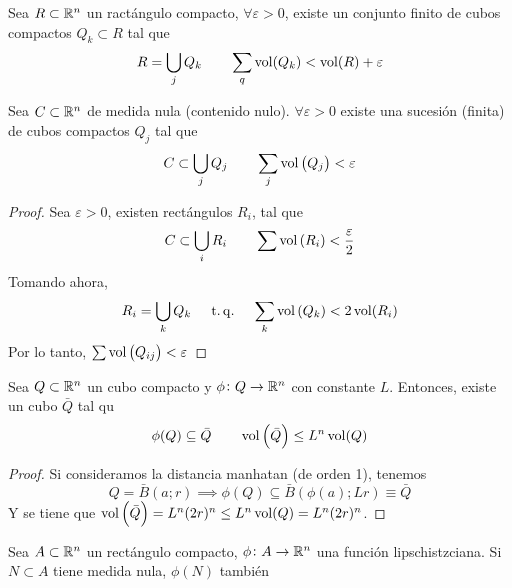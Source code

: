 \begin{lema*}
    Sea $R \subset \mathbb{R}^n$ un ractángulo compacto, $\forall \varepsilon > 0$, existe un conjunto finito de cubos compactos $Q_k \subset R$ tal que
    \[
        R = \bigcup_{j} Q_k \qquad
        \sum_{q} \operatorname{vol}(Q_k) < \operatorname{vol}(R) + \varepsilon
    \]
\end{lema*}

\begin{lema*}
    Sea $C \subset \mathbb{R}^n$ de medida nula (contenido nulo). $\forall \varepsilon > 0$ existe una sucesión (finita) de cubos compactos $Q_j$ tal que
    \[
        C \subset \bigcup_{j} Q_j \qquad
        \sum_j \operatorname{vol}\left( Q_j \right) < \varepsilon
    \]
\end{lema*}

\begin{proof}
    Sea $\varepsilon > 0$, existen rectángulos $R_i$, tal que
    \[
        C \subset \bigcup_i R_i \qquad
        \sum \operatorname{vol}\left( R_i \right) < \frac{\varepsilon}{2}
    \]
    Tomando ahora,
    \[
        R_i = \bigcup_k Q_k \quad \operatorname{\;t.q.\;} \quad
        \sum_k \operatorname{vol}\left( Q_k \right) < 2 \operatorname{vol}(R_i)
    \]
    Por lo tanto, $\sum \operatorname{vol}\left(Q_{ij}\right) < \varepsilon$
\end{proof}

\begin{lema*}
    Sea $Q \subset \mathbb{R}^n$ un cubo compacto y $\phi \colon Q \to \mathbb{R}^n$ con constante $L$. Entonces, existe un cubo
    $\bar{Q}$ tal qu
    \[
        \phi(Q) \subseteq \bar{Q} \qquad
        \operatorname{vol}\left( \bar{Q} \right) \leq L^n \operatorname{vol}(Q)
    \]
\end{lema*}

\begin{proof}
    Si consideramos la distancia manhatan (de orden 1), tenemos
    \[
        Q = \bar{B}(a;r) \implies \phi(Q) \subseteq \bar{B} \left( \phi(a); Lr \right) \equiv \bar{Q}
    \]
    Y se tiene que $\operatorname{vol}\left( \bar{Q} \right) = L^n (2r)^n \leq L^n \operatorname{vol}(Q) = L^n (2r)^n$.
\end{proof}

\begin{lema*}
    Sea $A \subset \mathbb{R}^n$ un rectángulo compacto, $\phi \colon A \to \mathbb{R}^n$ una función lipschistzciana. Si $N \subset A$ tiene
    medida nula, $\phi(N)$ tambi\'en 
\end{lema*}

